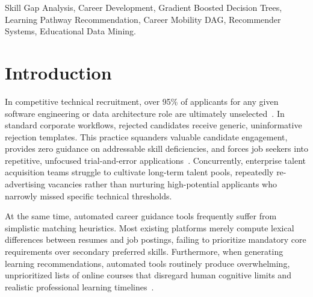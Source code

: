 \documentclass[conference]{IEEEtran}
\begin{document}
\begin{IEEEkeywords}
Skill Gap Analysis, Career Development, Gradient Boosted Decision Trees, Learning Pathway Recommendation, Career Mobility DAG, Recommender Systems, Educational Data Mining.
\end{IEEEkeywords}

\section{Introduction}
In competitive technical recruitment, over 95\% of applicants for any given software engineering or data architecture role are ultimately unselected~\cite{sackett2022revisiting}. In standard corporate workflows, rejected candidates receive generic, uninformative rejection templates. This practice squanders valuable candidate engagement, provides zero guidance on addressable skill deficiencies, and forces job seekers into repetitive, unfocused trial-and-error applications~\cite{zhang2023job}. Concurrently, enterprise talent acquisition teams struggle to cultivate long-term talent pools, repeatedly re-advertising vacancies rather than nurturing high-potential applicants who narrowly missed specific technical thresholds.

At the same time, automated career guidance tools frequently suffer from simplistic matching heuristics. Most existing platforms merely compute lexical differences between resumes and job postings, failing to prioritize mandatory core requirements over secondary preferred skills. Furthermore, when generating learning recommendations, automated tools routinely produce overwhelming, unprioritized lists of online courses that disregard human cognitive limits and realistic professional learning timelines~\cite{ricci2015recommender}.
\end{document}
